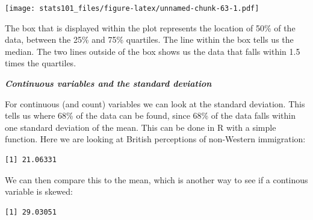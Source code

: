 \documentclass[]{article}
\newenvironment{Shaded}{\begin{snugshade}}{\end{snugshade}}
\newcommand{\DataTypeTok}[1]{\textcolor[rgb]{0.13,0.29,0.53}{#1}}
\newcommand{\KeywordTok}[1]{\textcolor[rgb]{0.13,0.29,0.53}{\textbf{#1}}}
\newcommand{\NormalTok}[1]{#1}
\newcommand{\OperatorTok}[1]{\textcolor[rgb]{0.81,0.36,0.00}{\textbf{#1}}}
\newcommand{\OtherTok}[1]{\textcolor[rgb]{0.56,0.35,0.01}{#1}}
\newcommand{\StringTok}[1]{\textcolor[rgb]{0.31,0.60,0.02}{#1}}
\begin{document}
\begin{Shaded}
\end{Shaded}

\texttt{[image: stats101\_files/figure-latex/unnamed-chunk-63-1.pdf]}

The box that is displayed within the plot represents the location of 50\% of the data, between the 25\% and 75\% quartiles. The line within the box tells us the median. The two lines outside of the box shows us the data that falls within 1.5 times the quartiles.

\textbf{\emph{Continuous variables and the standard deviation}}

For continuous (and count) variables we can look at the standard deviation. This tells us where 68\% of the data can be found, since 68\% of the data falls within one standard deviation of the mean. This can be done in R with a simple function. Here we are looking at British perceptions of non-Western immigration:

\begin{Shaded}
\end{Shaded}

\begin{verbatim}
[1] 21.06331
\end{verbatim}

We can then compare this to the mean, which is another way to see if a continous variable is skewed:

\begin{Shaded}
\end{Shaded}

\begin{verbatim}
[1] 29.03051
\end{verbatim}
\end{document}
